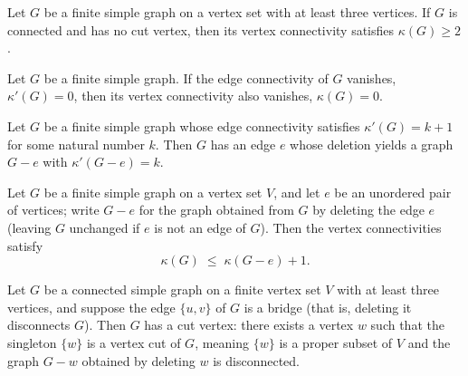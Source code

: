 \begin{theorem}
\label{SimpleGraph.two_le_vertexConnectivity_of_no_cutVertex}
\leanok
{}
Let $G$ be a finite simple graph on a vertex set with at least three vertices. If $G$ is
connected and has no cut vertex, then its vertex connectivity satisfies $\kappa(G) \ge
2$.
\end{theorem}

\begin{theorem}
\label{SimpleGraph.vertexConnectivity_eq_zero_of_edgeConnectivity_eq_zero}
\leanok
{}
Let $G$ be a finite simple graph. If the edge connectivity of $G$ vanishes, $\kappa'(G)
= 0$, then its vertex connectivity also vanishes, $\kappa(G) = 0$.
\end{theorem}

\begin{theorem}
\label{SimpleGraph.exists_deleteEdge_edgeConnectivity_eq}
\leanok
{}
Let $G$ be a finite simple graph whose edge connectivity satisfies $\kappa'(G) = k+1$
for some natural number $k$. Then $G$ has an edge $e$ whose deletion yields a graph $G -
e$ with $\kappa'(G - e) = k$.
\end{theorem}

\begin{theorem}
\label{SimpleGraph.vertexConnectivity_le_deleteEdge_succ}
Let $G$ be a finite simple graph on a vertex set $V$, and let $e$ be an unordered pair
of vertices; write $G - e$ for the graph obtained from $G$ by deleting the edge $e$
(leaving $G$ unchanged if $e$ is not an edge of $G$). Then the vertex connectivities
satisfy
\[
\kappa(G) \;\le\; \kappa(G - e) + 1 .
\]
\end{theorem}

\begin{theorem}
\label{SimpleGraph.exists_isVertexCut_singleton_of_isBridge}
Let $G$ be a connected simple graph on a finite vertex set $V$ with at least three
vertices, and suppose the edge $\{u,v\}$ of $G$ is a bridge (that is, deleting it
disconnects $G$). Then $G$ has a cut vertex: there exists a vertex $w$ such that the
singleton $\{w\}$ is a vertex cut of $G$, meaning $\{w\}$ is a proper subset of $V$ and
the graph $G - w$ obtained by deleting $w$ is disconnected.
\end{theorem}

